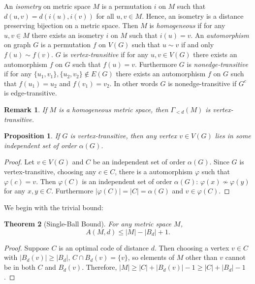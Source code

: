 \documentclass[12pt]{article}
\newtheorem{theorem}{Theorem}
\newtheorem{proposition}[theorem]{Proposition}
\newtheorem{remark}{Remark}
\begin{document}
An \textit{isometry} on metric space $M$ is a permutation $i$ on $M$ such that $d(u,v)=d(i(u),i(v))$ for all $u,v\in M$. Hence, an isometry is a distance preserving bijection on a metric space. Then $M$ is \textit{homogeneous} if for any $u,v\in M$ there exists an isometry $i$ on $M$ such that $i(u)=v$. An \textit{automorphism} on graph $G$ is a permutation $f$ on $V(G)$ such that $u\sim v$ if and only $f(u)\sim f(v)$. $G$ is \textit{vertex-transitive} if for any $u,v\in V(G)$ there exists an automorphism $f$ on $G$ such that $f(u)=v$. Furthermore $G$ is \textit{nonedge-transitive} if for any $\{u_1,v_1\},\{u_2,v_2\}\not\in E(G)$ there exists an automorphism $f$ on $G$ such that $f(u_1)=u_2$ and $f(v_1)=v_2$. In other words $G$ is nonedge-transitive if $G^c$ is edge-transitive.



\begin{remark}
\label{rmk: homo->vtx trans}
    If $M$ is a homogeneous metric space, then $\Gamma_{<d}(M)$ is vertex-transitive.
\end{remark}



\begin{proposition}
\label{prop: homo->vtx in ind}
    If $G$ is vertex-transitive, then any vertex $v\in V(G)$ lies in some independent set of order $\alpha(G)$.
\end{proposition}
\begin{proof}
    Let $v\in V(G)$ and $C$ be an independent set of order $\alpha(G)$. Since $G$ is vertex-transitive, choosing any $c\in C$, there is a automorphism $\varphi$ such that $\varphi(c)=v$. Then $\varphi(C)$ is an independent set of order $\alpha(G)$: $\varphi(x)\not\sim \varphi(y)$ for any $x,y\in C$. Furthermore $|\varphi(C)|=|C|=\alpha(G)$ and $v\in \varphi(C)$.
\end{proof}



We begin with the trivial bound:

\begin{theorem}[Single-Ball Bound]
\label{thm: SB}
    For any metric space $M$,
    $$A(M,d)\leq |M|-|B_d|+1.$$
\end{theorem}
\begin{proof}
Suppose $C$ is an optimal code of distance $d$. Then choosing a vertex $v\in C$ with $|B_d(v)|\geq|B_d|$, $C\cap B_d(v)=\{v\}$, so elements of $M$ other than $v$ cannot be in both $C$ and $B_d(v)$. Therefore, $|M|\geq |C|+|B_d(v)|-1\geq|C|+|B_d|-1$. 
\end{proof}
\end{document}
